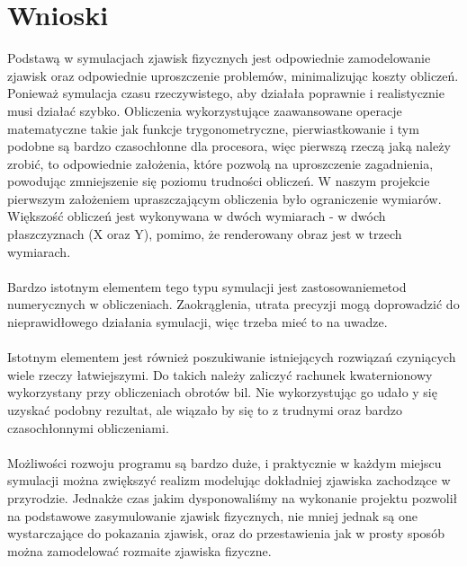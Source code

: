 \section{Wnioski}

Podstawą w symulacjach zjawisk fizycznych jest odpowiednie zamodelowanie zjawisk oraz odpowiednie uproszczenie problemów, minimalizując koszty obliczeń. Ponieważ symulacja czasu rzeczywistego, aby działała poprawnie i realistycznie musi działać szybko. Obliczenia wykorzystujące zaawansowane operacje matematyczne takie jak funkcje trygonometryczne, pierwiastkowanie i tym podobne są bardzo czasochłonne dla procesora, więc pierwszą rzeczą jaką należy zrobić, to odpowiednie założenia, które pozwolą na uproszczenie zagadnienia, powodując zmniejszenie się poziomu trudności obliczeń. W naszym projekcie pierwszym założeniem upraszczającym obliczenia było ograniczenie wymiarów. Większość obliczeń jest wykonywana w dwóch wymiarach - w dwóch płaszczyznach (X oraz Y), pomimo, że renderowany obraz jest w trzech wymiarach. \\ \\

Bardzo istotnym elementem tego typu symulacji jest zastosowaniemetod numerycznych w obliczeniach. Zaokrąglenia, utrata precyzji mogą doprowadzić do nieprawidłowego działania symulacji, więc trzeba mieć to na uwadze. \\ \\

Istotnym elementem jest również poszukiwanie istniejących rozwiązań czyniących wiele rzeczy łatwiejszymi. Do takich należy zaliczyć rachunek kwaternionowy wykorzystany przy obliczeniach obrotów bil. Nie wykorzystując go udało y się uzyskać podobny rezultat, ale wiązało by się to z trudnymi oraz bardzo czasochłonnymi obliczeniami. \\ \\

Możliwości rozwoju programu są bardzo duże, i praktycznie w każdym miejscu symulacji można zwiększyć realizm modelując dokładniej zjawiska zachodzące w przyrodzie. Jednakże czas jakim dysponowaliśmy na wykonanie projektu pozwolił na podstawowe zasymulowanie zjawisk fizycznych, nie mniej jednak są one wystarczające do pokazania zjawisk, oraz do przestawienia jak w prosty sposób można zamodelować rozmaite zjawiska fizyczne.